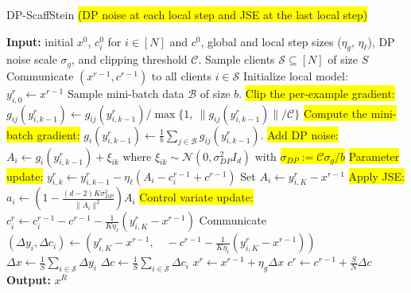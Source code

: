 \begin{algorithm}[H]
\caption{DP-ScaffStein \colorbox{yellow}{(DP noise at {\color{red}each} local step and JSE at the {\color{red}last} local step)}}
\label{algo:scaffstein_3}
\begin{algorithmic}[1]
\State \textbf{Input:} initial $x^0$, $c_i^0$ for $i \in [N]$ and $c^0$, global and local step sizes ($\eta_g$, $\eta_\ell$), DP noise scale $\sigma_g$, and clipping threshold $\mathcal{C}$.
\State Sample clients $\mathcal{S} \subseteq [N]$ of size $S$
\State Communicate $(x^{r-1}, c^{r-1})$ to all clients $i \in \mathcal{S}$
\State Initialize local model: $y_{i,0}^{r} \gets x^{r-1}$
\State Sample mini-batch data $\mathcal{B}$ of size $b$.
\State \colorbox{yellow}{Clip the per-example gradient:}
\State $g_{ij}(y^r_{i,k-1}) \gets g_{ij}(y^r_{i,k-1}) / \max \{1, \ \|g_{ij}(y^r_{i,k-1})\|/\mathcal{C}\} $
\EndFor
\State \colorbox{yellow}{Compute the mini-batch gradient:}
$g_{i}(y_{i,k-1}^{r}) \gets \frac{1}{b} \sum_{j \in \mathcal{B}} g_{ij}(y_{i,k-1}^{r})$. 
\State \colorbox{yellow}{Add DP noise:}  $A_i \gets g_i(y_{i,k-1}^{r}) +  \xi_{ik}$ where $\xi_{ik} \sim \mathcal{N}(0,  \sigma_{DP}^2 I_d)$ with \colorbox{yellow}{$\sigma_{DP}:= \mathcal{C} \sigma_g/b$}
\State \colorbox{yellow}{Parameter update:} $y_{i,k}^{r} \gets y_{i,k-1}^{r} - \eta_\ell (A_i - c_i^{r-1} + c^{r-1})$
\EndFor
\State Set $A_i \gets y^r_{i,K} - x^{r-1}$
\State \colorbox{yellow}{Apply JSE:}  $a_i \gets \left( 1 - \frac{(d-2)K\sigma_{DP}^2}{\|A_i\|^2} \right) A_i$
\State \colorbox{yellow}{Control variate update:}  $c_i^r \gets c_i^{r-1} - c^{r-1} - \frac{1}{K \eta_\ell} ( y_{i,K}^r - x^{r-1} )$
\State Communicate $(\Delta y_i,\Delta c_i) \gets \left(y_{i,K}^r - x^{r-1}, \quad - c^{r-1} - \frac{1}{K \eta_\ell} ( y_{i,K}^r - x^{r-1} ) \right)$ 
\EndFor
\State $\Delta x  \gets \frac{1}{S} \sum_{i \in \mathcal{S}} \Delta y_i$
\State $\Delta c \gets \frac{1}{S} \sum_{i \in \mathcal{S}} \Delta c_i$
\State $x^r \gets x^{r-1} + \eta_g \Delta x$
\State $c^r \gets c^{r-1} +\frac{S}{N}\Delta c$
\EndFor
\State \textbf{Output:} $x^R$
\end{algorithmic}
\end{algorithm}

 